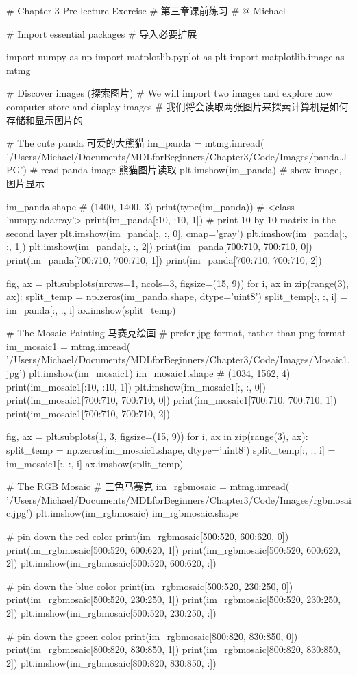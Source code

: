 \documentclass[12pt]{article}
\numberwithin{equation}{section}
\numberwithin{figure}{section}
\begin{document}
\begin{python}
# Chapter 3 Pre-lecture Exercise
# 第三章课前练习
# @ Michael

# Import essential packages
# 导入必要扩展

import numpy as np
import matplotlib.pyplot as plt
import matplotlib.image as mtmg

# Discover images (探索图片)
# We will import two images and explore how computer store and display images
# 我们将会读取两张图片来探索计算机是如何存储和显示图片的

# The cute panda 可爱的大熊猫
im_panda = mtmg.imread(
    '/Users/Michael/Documents/MDLforBeginners/Chapter3/Code/Images/panda.JPG')
# read panda image 熊猫图片读取
plt.imshow(im_panda)  # show image, 图片显示

im_panda.shape  # (1400, 1400, 3)
print(type(im_panda))   # <class 'numpy.ndarray'>
print(im_panda[:10, :10, 1])  # print 10 by 10 matrix in the second layer
plt.imshow(im_panda[:, :, 0], cmap='gray')
plt.imshow(im_panda[:, :, 1])
plt.imshow(im_panda[:, :, 2])
print(im_panda[700:710, 700:710, 0])
print(im_panda[700:710, 700:710, 1])
print(im_panda[700:710, 700:710, 2])

fig, ax = plt.subplots(nrows=1, ncols=3, figsize=(15, 9))
for i, ax in zip(range(3), ax):
    split_temp = np.zeros(im_panda.shape, dtype='uint8')
    split_temp[:, :, i] = im_panda[:, :, i]
    ax.imshow(split_temp)


# The Mosaic Painting 马赛克绘画
# prefer jpg format, rather than png format
im_mosaic1 = mtmg.imread(
    '/Users/Michael/Documents/MDLforBeginners/Chapter3/Code/Images/Mosaic1.jpg')
plt.imshow(im_mosaic1)
im_mosaic1.shape  # (1034, 1562, 4)
print(im_mosaic1[:10, :10, 1])
plt.imshow(im_mosaic1[:, :, 0])
print(im_mosaic1[700:710, 700:710, 0])
print(im_mosaic1[700:710, 700:710, 1])
print(im_mosaic1[700:710, 700:710, 2])

fig, ax = plt.subplots(1, 3, figsize=(15, 9))
for i, ax in zip(range(3), ax):
    split_temp = np.zeros(im_mosaic1.shape, dtype='uint8')
    split_temp[:, :, i] = im_mosaic1[:, :, i]
    ax.imshow(split_temp)


# The RGB Mosaic
# 三色马赛克
im_rgbmosaic = mtmg.imread(
    '/Users/Michael/Documents/MDLforBeginners/Chapter3/Code/Images/rgbmosaic.jpg')
plt.imshow(im_rgbmosaic)
im_rgbmosaic.shape

# pin down the red color
print(im_rgbmosaic[500:520, 600:620, 0])
print(im_rgbmosaic[500:520, 600:620, 1])
print(im_rgbmosaic[500:520, 600:620, 2])
plt.imshow(im_rgbmosaic[500:520, 600:620, :])

# pin down the blue color
print(im_rgbmosaic[500:520, 230:250, 0])
print(im_rgbmosaic[500:520, 230:250, 1])
print(im_rgbmosaic[500:520, 230:250, 2])
plt.imshow(im_rgbmosaic[500:520, 230:250, :])

# pin down the green color
print(im_rgbmosaic[800:820, 830:850, 0])
print(im_rgbmosaic[800:820, 830:850, 1])
print(im_rgbmosaic[800:820, 830:850, 2])
plt.imshow(im_rgbmosaic[800:820, 830:850, :])	
\end{python}
\end{document}
